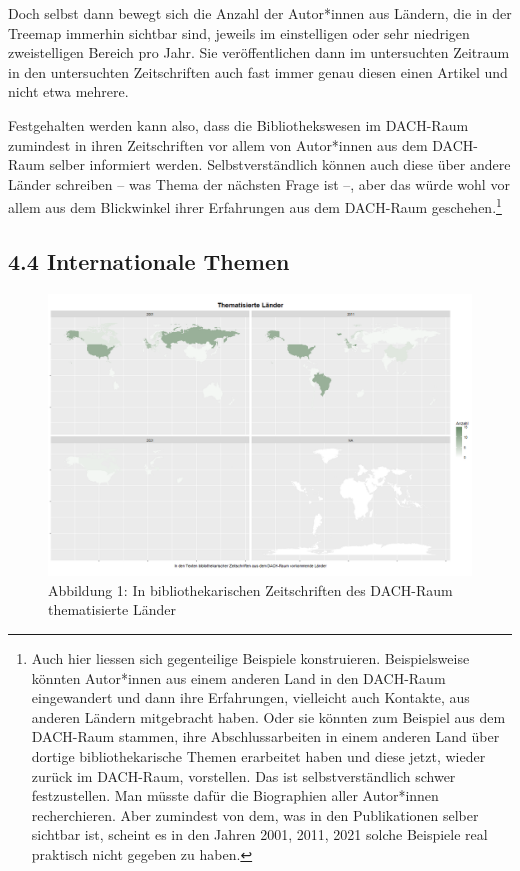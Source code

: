 \documentclass[a4paper,
fontsize=11pt,
oneside,
numbers=noperiodatend,
parskip=half-,
bibliography=totoc,
final
]{scrartcl}
\begin{document}
Doch selbst dann bewegt sich die Anzahl der Autor*innen aus Ländern, die
in der Treemap immerhin sichtbar sind, jeweils im einstelligen oder sehr
niedrigen zweistelligen Bereich pro Jahr. Sie veröffentlichen dann im
untersuchten Zeitraum in den untersuchten Zeitschriften auch fast immer
genau diesen einen Artikel und nicht etwa mehrere.

Festgehalten werden kann also, dass die Bibliothekswesen im DACH-Raum
zumindest in ihren Zeitschriften vor allem von Autor*innen aus dem
DACH-Raum selber informiert werden. Selbstverständlich können auch diese
über andere Länder schreiben -- was Thema der nächsten Frage ist --,
aber das würde wohl vor allem aus dem Blickwinkel ihrer Erfahrungen aus
dem DACH-Raum geschehen.\footnote{Auch hier liessen sich gegenteilige
  Beispiele konstruieren. Beispielsweise könnten Autor*innen aus einem
  anderen Land in den DACH-Raum eingewandert und dann ihre Erfahrungen,
  vielleicht auch Kontakte, aus anderen Ländern mitgebracht haben. Oder
  sie könnten zum Beispiel aus dem DACH-Raum stammen, ihre
  Abschlussarbeiten in einem anderen Land über dortige bibliothekarische
  Themen erarbeitet haben und diese jetzt, wieder zurück im DACH-Raum,
  vorstellen. Das ist selbstverständlich schwer festzustellen. Man
  müsste dafür die Biographien aller Autor*innen recherchieren. Aber
  zumindest von dem, was in den Publikationen selber sichtbar ist,
  scheint es in den Jahren 2001, 2011, 2021 solche Beispiele real
  praktisch nicht gegeben zu haben.}

\hypertarget{internationale-themen-1}{%
\subsection{4.4 Internationale Themen}\label{internationale-themen-1}}

\begin{figure}[p!]
\centering
\includegraphics[width=1.3\textwidth, angle=90]{img/abb2.PNG}
\caption{Abbildung 1: In bibliothekarischen Zeitschriften des DACH-Raum
thematisierte Länder}
\end{figure}
\end{document}
